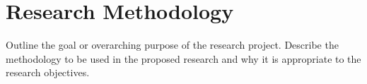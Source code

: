 \chapter{Research Methodology}
Outline the goal or overarching purpose of the research project.
Describe the methodology to be used in the proposed research and why it is appropriate to the research objectives.